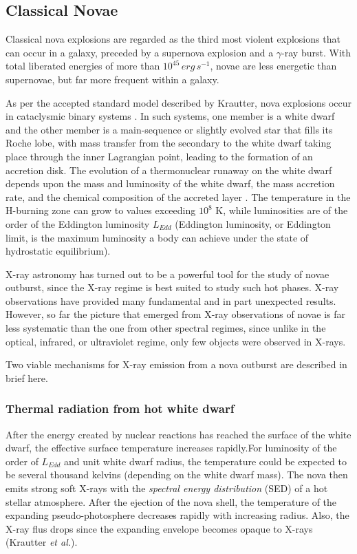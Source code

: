 		\subsection{Classical Novae} \label{introduction:current_status:CNe}
			Classical nova explosions are regarded as the third most violent explosions that can occur in a galaxy, preceded by a supernova explosion and a $\gamma$-ray burst. With total liberated energies of more than $10^{45}\,erg\,s^{-1}$, novae are less energetic than supernovae, but far more frequent within a galaxy.
			
			As per the accepted standard model described by Krautter, nova explosions occur in cataclysmic binary systems \cite{krautter08}. In such systems, one member is a white dwarf and the other member is a main-sequence or slightly evolved star that fills its Roche lobe, with mass transfer from the secondary to the white dwarf taking place through the inner Lagrangian point, leading to the formation of an accretion disk. The evolution of a thermonuclear runaway on the white dwarf depends upon the mass and luminosity of the white dwarf, the mass accretion rate, and the chemical composition of the accreted layer \cite{starrfield89}. The temperature in the H-burning zone can grow to values exceeding $10^8$ K, while luminosities are of the order of the Eddington luminosity $L_{Edd}$ (Eddington luminosity, or Eddington limit, is the maximum luminosity a body can achieve under the state of hydrostatic equilibrium).
			
			X-ray astronomy has turned out to be a powerful tool for the study of novae outburst, since the X-ray regime is best suited to study such hot phases. X-ray observations have provided many fundamental and in part unexpected results. However, so far the picture that emerged from X-ray observations of novae is far less systematic than the one from other spectral regimes, since unlike in the optical, infrared, or ultraviolet regime, only few objects were observed in X-rays.
			
			Two viable mechanisms for X-ray emission from a nova outburst are described in brief here.
			
			\subsubsection{Thermal radiation from hot white dwarf}
				After the energy created by nuclear reactions has reached the surface of the white dwarf, the effective surface temperature increases rapidly.For luminosity of the order of $L_{Edd}$ and unit white dwarf radius, the temperature could be expected to be several thousand kelvins (depending on the white dwarf mass). The nova then emits strong soft X-rays with the \emph{spectral energy distribution} (SED) of a hot stellar atmosphere. After the ejection of the nova shell, the temperature of the expanding pseudo-photosphere decreases rapidly with increasing radius. Also, the X-ray flus drops since the expanding envelope becomes opaque to X-rays (Krautter \emph{et al.})\cite{krautter96}.
				
